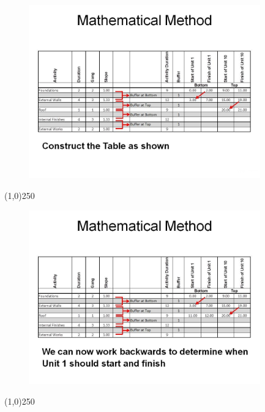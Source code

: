 \begin{frame}
\begin{figure}
	\centering
		\includegraphics[width = 10.0cm]{oldnotes/Slide290.jpg}
\end{figure}
\end{frame}
\begin{center}\line(1,0){250}\end{center}






\begin{frame}
\begin{figure}
	\centering
		\includegraphics[width = 10.0cm]{oldnotes/Slide291.jpg}
\end{figure}
\end{frame}
\begin{center}\line(1,0){250}\end{center}






